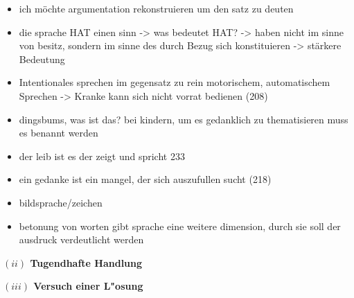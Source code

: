 \documentclass[a4paper, emulatestandardclasses, 12pt]{scrartcl}
\begin{document}
\begin{onehalfspace}
\begin{itemize}
  \item ich möchte argumentation rekonstruieren um den satz zu deuten
  \item die sprache HAT einen sinn -> was bedeutet HAT? -> haben nicht im sinne von besitz, sondern im sinne des durch Bezug sich konstituieren -> stärkere Bedeutung 
  \item Intentionales sprechen im gegensatz zu rein motorischem, automatischem Sprechen -> Kranke kann sich nicht vorrat bedienen (208)
  \item dingsbums, was ist das? bei kindern, um es gedanklich zu thematisieren muss es benannt werden
  \item der leib ist es der zeigt und spricht 233
  \item ein gedanke ist ein mangel, der sich auszufullen sucht (218)
  \item bildsprache/zeichen 
  \item betonung von worten gibt sprache eine weitere dimension, durch sie soll der ausdruck verdeutlicht werden
\end{itemize}


\vspace{5mm}
\noindent\textbf{$(ii)$ Tugendhafte Handlung}	

\noindent 


\vspace{5mm}
\noindent\textbf{$(iii)$ Versuch einer L"osung}	

\noindent 


\vspace{5mm}

\vspace{3mm}

\end{onehalfspace}
\nocite{*}
%
\printbibliography
\end{document}
